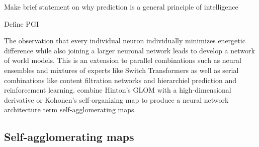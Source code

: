 
Make brief statement on why prediction is a general principle of intelligence

Define PGI 

The observation that every individual neuron individually minimizes energetic difference while also joining a larger neuronal network leads \us to develop a network of world models. This is an extension to parallel combinations such as neural ensembles and mixtures of experts \cite{Shazeer2017} like Switch Transformers as well as serial combinations like content filtration networks and hierarchiel prediction and reinforcement learning. \We combine Hinton's GLOM \cite{hinton2021represent} with a high-dimensional derivative or Kohonen's self-organizing map \cite{58325} to produce a neural network architecture \we term self-agglomerating maps.

\subsection{Self-agglomerating maps}
